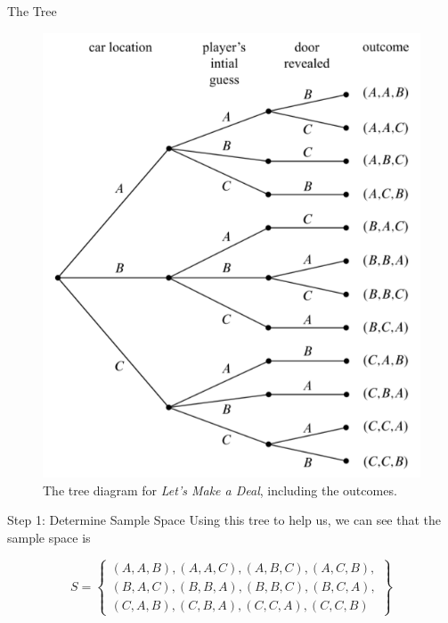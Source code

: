 \documentclass{beamer}
\begin{document}
\begin{frame}{The Tree}
    \begin{figure}
        \centering
        \includegraphics[scale=.5]{montyhalloutcomes.png}
        \caption{The tree diagram for \textit{Let's Make a Deal}, including the outcomes.}
        \label{fig:montyhalloutcomes}
    \end{figure}
\end{frame}

\begin{frame}{Step 1: Determine Sample Space}
    Using this tree to help us, we can see that the sample space is 
    
    \[ S=\left\{\begin{array}{l}
{(A, A, B), (A, A, C), (A, B, C), (A, C, B),} \\ {(B, A, C),(B, B, A), (B, B, C),(B, C, A)}, \\{(C, A, B),(C, B, A),(C, C, A),(C, C, B)}
\end{array}\right\} \]
\end{frame}
\end{document}
